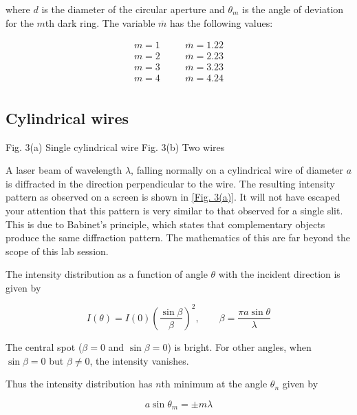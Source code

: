 where $d$ is the diameter of the circular aperture and $\theta_m$ is the angle of deviation for the $m$th dark ring. The variable $\overline{m}$ has the following values:

\begin{equation*}
    \begin{aligned}
        m = 1 &\quad& \overline{m}=1.22\\
        m = 2 &\quad& \overline{m}=2.23\\
        m = 3 &\quad& \overline{m}=3.23\\
        m = 4 &\quad& \overline{m}=4.24\\
    \end{aligned}
\end{equation*}

\subsection*{Cylindrical wires}

 
 Fig. 3(a) Single cylindrical wire                                Fig. 3(b) Two wires

A laser beam of wavelength $\lambda$, falling normally on a cylindrical wire of diameter $a$ is diffracted in the direction perpendicular to the wire. The resulting intensity pattern as observed on a screen is shown in \ref{Fig. 3(a)}. It will not have escaped your attention that this pattern is very similar to that observed for a single slit. This is due to Babinet’s principle, which states that complementary objects produce the same diffraction pattern. The mathematics of this are far beyond the scope of this lab session.

The intensity distribution as a function of angle $\theta$ with the incident direction is given by

\begin{equation*}
    I(\theta) = I(0) \left( \frac{\sin \beta}{\beta} \right)^2, \quad \quad  \beta = \frac{\pi a \sin \theta}{\lambda}
\end{equation*}


The central spot ($\beta = 0$ and $\sin\beta = 0$) is bright. For other angles, when $\sin\beta=0$ but $\beta \neq 0$, the intensity vanishes.

Thus the intensity distribution has $n$th minimum at the angle $\theta_n$ given by

\begin{equation*}
    a \sin\theta_m = \pm m \lambda
\end{equation*}

